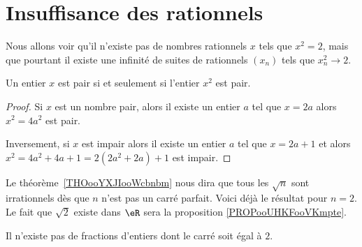 \section{Insuffisance des rationnels}

Nous allons voir qu'il n'existe pas de nombres rationnels \( x\) tels que \( x^2=2\), mais que pourtant il existe une infinité de suites de rationnels \( (x_n)\) tels que \(  x_n^2\to 2  \).

\begin{lemma}       \label{LemJPIUooWFHaFM}
    Un entier \( x\) est pair si et seulement si l'entier \( x^2\) est pair.
\end{lemma}

\begin{proof}
    Si \( x\) est un nombre pair, alors il existe un entier \( a\) tel que \( x=2a\) alors \( x^2=4a^2\) est pair.

    Inversement, si \( x\) est impair alors il existe un entier \( a\) tel que \( x=2a+1\) et alors \( x^2=4a^2+4a+1=2(2a^2+2a)+1\) est impair.
\end{proof}

Le théorème~\ref{THOooYXJIooWcbnbm} nous dira que tous les \( \sqrt{n}\) sont irrationnels dès que \( n\) n'est pas un carré parfait. Voici déjà le résultat pour \( n=2\). Le fait que \( \sqrt{ 2 }\) existe dans \( \eR\) sera la proposition \ref{PROPooUHKFooVKmpte}.
\begin{proposition}     \label{PropooRJMSooPrdeJb}
    Il n'existe pas de fractions d'entiers dont le carré soit égal à \( 2\).
\end{proposition}

